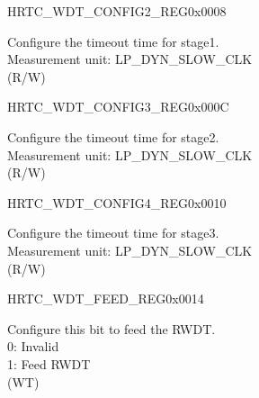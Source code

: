 \begin{register}{H}{RTC\_WDT\_CONFIG2\_REG}{0x0008}\label{regdesc:RTCWDTCONFIG2REG}
%
\regnewline%
\begin{regdesc}\begin{reglist}
\label{fielddesc:RTCWDTSTG1HOLD}\item [RTC\_WDT\_STG1\_HOLD] Configure the timeout time for stage1.\\
Measurement unit: LP\_DYN\_SLOW\_CLK  \\ (R/W)
\end{reglist}\end{regdesc}
\end{register}


\begin{register}{H}{RTC\_WDT\_CONFIG3\_REG}{0x000C}\label{regdesc:RTCWDTCONFIG3REG}
%
\regnewline%
\begin{regdesc}\begin{reglist}
\label{fielddesc:RTCWDTSTG2HOLD}\item [RTC\_WDT\_STG2\_HOLD] Configure the timeout time for stage2.\\
Measurement unit: LP\_DYN\_SLOW\_CLK  \\ (R/W)
\end{reglist}\end{regdesc}
\end{register}


\begin{register}{H}{RTC\_WDT\_CONFIG4\_REG}{0x0010}\label{regdesc:RTCWDTCONFIG4REG}
%
\regnewline%
\begin{regdesc}\begin{reglist}
\label{fielddesc:RTCWDTSTG3HOLD}\item [RTC\_WDT\_STG3\_HOLD] Configure the timeout time for stage3.\\
Measurement unit: LP\_DYN\_SLOW\_CLK  \\ (R/W)
\end{reglist}\end{regdesc}
\end{register}


\begin{register}{H}{RTC\_WDT\_FEED\_REG}{0x0014}\label{regdesc:RTCWDTFEEDREG}
%
%
\regnewline%
\begin{regdesc}\begin{reglist}
\label{fielddesc:RTCWDTFEED}\item [RTC\_WDT\_FEED] Configure this bit to feed the RWDT.\\
0: Invalid \\
1: Feed RWDT  \\ (WT)
\end{reglist}\end{regdesc}
\end{register}


